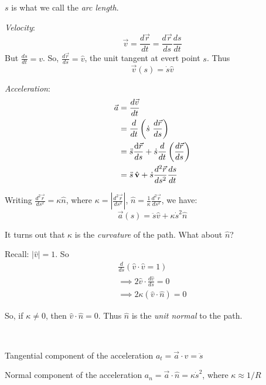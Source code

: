 \documentclass[10pt]{scrartcl}
\begin{document}
\begin{definition} $s$ is what we call the \emph{arc length}. 

\emph{Velocity}:
\[\vec{v} = \frac{d\vec{r}}{dt} = \frac{d\vec{r}}{ds}\frac{ds}{dt}\]
But $\displaystyle{\frac{ds}{dt} = v}$. So, $\displaystyle{\frac{d\vec{r}}{ds} = \hat{v}}$, the unit tangent at evert point $s$. Thus
\[\boxed{\vec{v}(s) = \dot{s}\hat{v}}\]

\emph{Acceleration}: \[\begin{aligned}
	\vec{a} &= \frac{d\vec{v}}{dt}\\ &= \frac{d}{dt}\left(\dot{s}~ \frac{d\vec{r}}{ds}\right)\\
	&= \ddot{s}\frac{\d\vec{r}}{ds} + \dot{s}\frac{d}{dt}\left(\frac{d\vec{r}}{ds}\right)\\
	 &= \ddot{s}\hat{v} + \dot{s}\frac{d^2\vec{r}}{ds^2}\frac{ds}{dt}\end{aligned}
\]

Writing $\displaystyle{\frac{d^2\vec{r}}{ds^2} = \kappa \hat{n}}$, where $\displaystyle{\kappa =\left|\frac{d^2\vec{r}}{ds^2}\right| }$, $\hat{n} = \displaystyle{\frac{1}{\kappa}\frac{d^2\vec{r}}{ds^2}}$, we have: 
\[\boxed{\vec{a}(s) = \ddot{s}\hat{v} + \kappa \dot{s}^2\hat{n}}\]

It turns out that $\kappa$ is the \emph{curvature} of the path. What about $\hat{n}$?

Recall: $|\hat{v}| = 1$. So 
\[\begin{aligned}\frac{d}{ds}(\hat{v}\cdot\hat{v} = 1)\\
 \implies 2\hat{v}\cdot\frac{d\hat{v}}{ds} = 0\\
 \implies 2\kappa(\hat{v}\cdot\hat{n}) = 0	
\end{aligned}
\]

So, if $\kappa \neq 0$, then $\hat{v}\cdot \hat{n} = 0$. Thus $\hat{n}$ is the \emph{unit normal} to the path.
\end{definition}~


Tangential component of the acceleration $a_t = \vec{a}\cdot\hat{v} = \ddot{s}$

Normal component of the acceleration $a_n = \vec{a}\cdot\hat{n} = \kappa \dot{s}^2$, where $\kappa \approx 1/R$

\begin{center}
\end{center}
\end{document}
